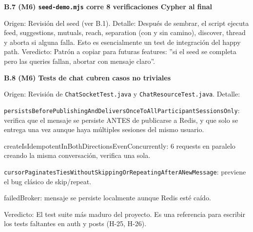 \documentclass[10pt,a4paper]{article}
\newcommand{\code}[1]{\nolinkurl{#1}}
\begin{document}
\vspace{0.6em}\noindent\textbf{\normalsize B.7 (M6) \code{seed-demo.mjs} corre 8 verificaciones Cypher al final}\par\vspace{0.2em}
Origen: Revisión del seed (ver B.1).  Detalle: Después de sembrar, el script ejecuta feed, suggestions, mutuals, reach, separation (con y sin camino), discover, thread y aborta si alguna falla. Esto es esencialmente un test de integración del happy path.  Veredicto: Patrón a copiar para futuras features: ''si el seed se completa pero las queries fallan, abortar con mensaje claro''.\par\vspace{0.4em}
\vspace{0.6em}\noindent\textbf{\normalsize B.8 (M6) Tests de chat cubren casos no triviales}\par\vspace{0.2em}
Origen: Revisión de \code{ChatSocketTest.java} y \code{ChatResourceTest.java}.  Detalle:\par\vspace{0.4em}
\code{persistsBeforePublishingAndDeliversOnceToAllParticipantSessionsOnly}: verifica que el mensaje se persiste ANTES de publicarse a Redis, y que solo se entrega una vez aunque haya múltiples sesiones del mismo usuario.\par\vspace{0.4em}
createIsIdempotentInBothDirectionsEvenConcurrently: 6 requests en paralelo creando la misma conversación, verifica una sola.\par\vspace{0.4em}
\code{cursorPaginatesTiesWithoutSkippingOrRepeatingAfterANewMessage}: previene el bug clásico de skip/repeat.\par\vspace{0.4em}
failedBroker: mensaje se persiste localmente aunque Redis esté caído.\par\vspace{0.4em}
Veredicto: El test suite más maduro del proyecto. Es una referencia para escribir los tests faltantes en auth y posts (H-25, H-26).\par\vspace{0.4em}
\end{document}
